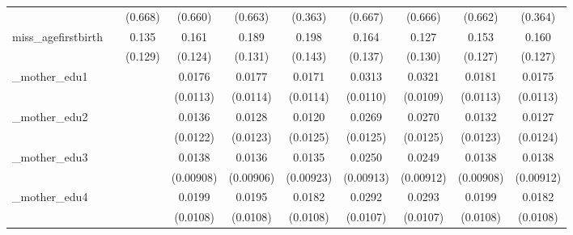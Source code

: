 \begin{table}[htbp]
\begin{tabular}{l*{9}{c}}
            &                     &     (0.668)         &     (0.660)         &     (0.663)         &     (0.363)         &     (0.667)         &     (0.666)         &     (0.662)         &     (0.364)         \\
[1em]
miss\_agefirstbirth&                     &       0.135         &       0.161         &       0.189         &       0.198         &       0.164         &       0.127         &       0.153         &       0.160         \\
            &                     &     (0.129)         &     (0.124)         &     (0.131)         &     (0.143)         &     (0.137)         &     (0.130)         &     (0.127)         &     (0.127)         \\
[1em]
\_mother\_edu1&                     &                     &      0.0176         &      0.0177         &      0.0171         &      0.0313\sym{***}&      0.0321\sym{***}&      0.0181         &      0.0175         \\
            &                     &                     &    (0.0113)         &    (0.0114)         &    (0.0114)         &    (0.0110)         &    (0.0109)         &    (0.0113)         &    (0.0113)         \\
[1em]
\_mother\_edu2&                     &                     &      0.0136         &      0.0128         &      0.0120         &      0.0269\sym{**} &      0.0270\sym{**} &      0.0132         &      0.0127         \\
            &                     &                     &    (0.0122)         &    (0.0123)         &    (0.0125)         &    (0.0125)         &    (0.0125)         &    (0.0123)         &    (0.0124)         \\
[1em]
\_mother\_edu3&                     &                     &      0.0138         &      0.0136         &      0.0135         &      0.0250\sym{***}&      0.0249\sym{***}&      0.0138         &      0.0138         \\
            &                     &                     &   (0.00908)         &   (0.00906)         &   (0.00923)         &   (0.00913)         &   (0.00912)         &   (0.00908)         &   (0.00912)         \\
[1em]
\_mother\_edu4&                     &                     &      0.0199\sym{*}  &      0.0195\sym{*}  &      0.0182\sym{*}  &      0.0292\sym{***}&      0.0293\sym{***}&      0.0199\sym{*}  &      0.0182\sym{*}  \\
            &                     &                     &    (0.0108)         &    (0.0108)         &    (0.0108)         &    (0.0107)         &    (0.0107)         &    (0.0108)         &    (0.0108)         \\

\end{tabular}
\end{table}
